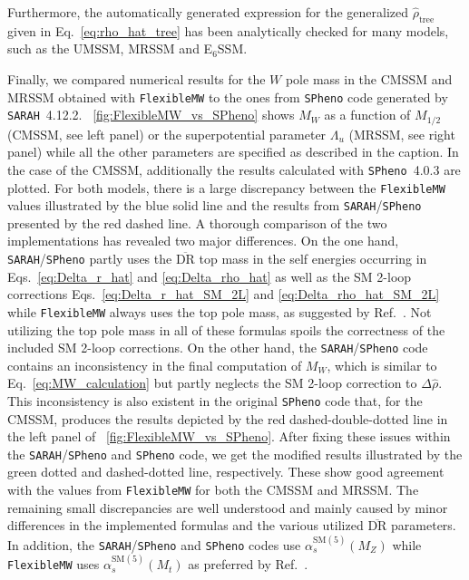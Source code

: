 \documentclass[final,3p,11pt,pdflatex]{elsarticle}
\makeatletter
\newcommand{\sarah}{\texttt{SARAH}\@\xspace}
\newcommand{\spheno}{\texttt{SPheno}\@\xspace}
\newcommand{\fmw}{\texttt{FlexibleMW}\@\xspace}
\newcommand{\ESSM}{E$_6$SSM\@\xspace}
\newcommand{\ol}[1]{\overline{#1}}
\newcommand{\DRbar}{\ensuremath{\ol{\text{DR}}}\xspace}
\newcommand{\SM}{\ensuremath{\text{SM}}\xspace}
\newcommand{\figref}[1]{\figurename~\ref{#1}}
\newcommand{\mhalf}{\ensuremath{M_{1/2}}\xspace}
\def\as{\alpha_s}
\makeatother
\begin{document}
Furthermore, the automatically generated expression for the
generalized $\hat\rho_\text{tree}$ given in Eq.~\eqref{eq:rho_hat_tree}
has been analytically checked for many models, such as the UMSSM,
MRSSM and \ESSM.

Finally, we compared numerical results for the $W$ pole mass in the
CMSSM and MRSSM obtained with \fmw to the ones from \spheno code
generated by \sarah~4.12.2. \figref{fig:FlexibleMW_vs_SPheno} shows $M_W$
as a function of $\mhalf$ (CMSSM, see left panel) or the superpotential
parameter $\Lambda_u$ (MRSSM, see right panel) while all
the other parameters are specified as described in the caption.
In the case of the CMSSM, additionally the results calculated with
\spheno~4.0.3 are plotted. For both models, there is a large
discrepancy between the \fmw values illustrated by the blue solid
line and the results from \sarah/\spheno presented by the red dashed
line. A thorough comparison of the two implementations has revealed
two major differences. On the one hand, \sarah/\spheno partly uses the
\DRbar top mass in the self energies occurring in
Eqs.~\eqref{eq:Delta_r_hat} and \eqref{eq:Delta_rho_hat} as well as
the SM 2-loop corrections Eqs.~\eqref{eq:Delta_r_hat_SM_2L} and
\eqref{eq:Delta_rho_hat_SM_2L} while \fmw always uses the top pole mass,
as suggested by Ref.~\cite{Fanchiotti:1992tu}. Not utilizing the top
pole mass in all of these formulas spoils the correctness of the
included SM 2-loop corrections. On the other hand, the
\sarah/\spheno code contains an inconsistency in the final computation of
$M_W$, which is similar to Eq.~\eqref{eq:MW_calculation} but partly
neglects the SM 2-loop correction to $\Delta\hat\rho$.
This inconsistency is also existent in the original \spheno code that,
for the CMSSM, produces the results depicted by the red dashed-double-dotted
line in the left panel of \figref{fig:FlexibleMW_vs_SPheno}.
After fixing these issues within the \sarah/\spheno and \spheno code,
we get the modified results illustrated by the green dotted and
dashed-dotted line, respectively. These show good agreement with the
values from \fmw for both the CMSSM and MRSSM\@.
The remaining small discrepancies are well
understood and mainly caused by minor differences in the implemented
formulas and the various utilized \DRbar parameters. In addition,
the \sarah/\spheno and \spheno codes use $\as^{\SM(5)}(M_Z)$ while \fmw uses
$\as^{\SM(5)}(M_t)$ as preferred by Ref.~\cite{Fanchiotti:1992tu}.
%
\end{document}
